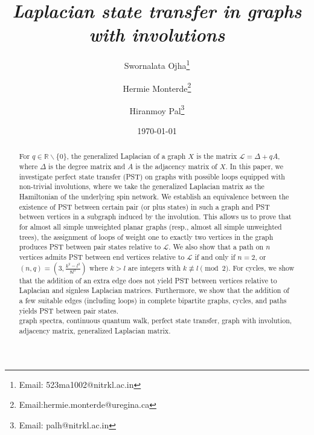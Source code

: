 \documentclass[12pt,a4paper]{article}
\title{\it Laplacian state transfer in graphs with involutions}
\author[1]{Swornalata Ojha\thanks{Email: 523ma1002@nitrkl.ac.in}}
\author[2]{Hermie Monterde\thanks{Email:hermie.monterde@uregina.ca}}
\author[1]{Hiranmoy Pal\thanks{Email: palh@nitrkl.ac.in}}
\affil[1]{\small Department of Mathematics, National Institute of Technology Rourkela, India-769008}
\affil[2]{\small Department of Mathematics and Statistics, University of Regina, SK, Canada S4S 0A2}
\date{\small {\today}}
\begin{document}
\maketitle




\begin{abstract}

For $q\in\mathbb{R}\backslash\{0\}$, the generalized Laplacian of a graph $X$ is the matrix $\mathscr{L}=\Delta+qA$, where $\Delta$ is the degree matrix and $A$ is the adjacency matrix of $X$. In this paper, we investigate perfect state transfer (PST) on graphs with possible loops equipped with non-trivial involutions, where we take the generalized Laplacian matrix as the Hamiltonian of the underlying spin network. We establish an equivalence between the existence of PST between certain pair (or plus states) in such a graph and PST between vertices in a subgraph induced by the involution. This allows us to prove that for almost all simple unweighted planar graphs (resp., almost all simple unweighted trees), the assignment of loops of weight one to exactly two vertices in the graph produces PST between pair states relative to $\mathscr{L}$.
We also show that a path on $n$ vertices admits PST between end vertices relative to $\mathscr{L}$ if and only if $n =2$, or $(n,q)=(3,\frac{k^2-l^2}{8l^2})$ where $k>l$ are integers with $k \not\equiv l \pmod{2}$. For cycles, we show that the addition of an extra edge does not yield PST between vertices relative to Laplacian and signless Laplacian matrices. Furthermore, we show that the addition of a few suitable edges (including loops) in complete bipartite graphs, cycles, and paths yields PST between pair states.\\

 graph spectra, continuous quantum walk, perfect state transfer, graph with involution, adjacency matrix, generalized Laplacian matrix.\\

\end{abstract}


\end{document}
